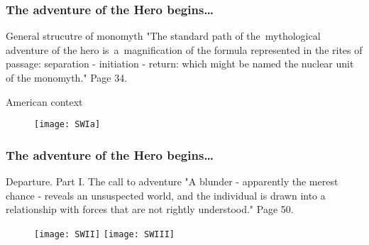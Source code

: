 \documentclass{beamer}  %
\begin{document}
\begin{frame}
  \frametitle{The adventure of the Hero begins\ldots}

  \begin{block}{General strucutre of monomyth}
    "The standard path of the~mythological adventure of the hero
    is~a~magnification of the formula represented in the rites of
    passage: separation - initiation - return: which might be named
    the nuclear unit of the monomyth." Page 34.
  \end{block}

  \begin{block}{American context}
    \begin{figure}
      \centering

      \texttt{[image: SWIa]}
    \end{figure}
  \end{block}

\end{frame}



\begin{frame}
  \frametitle{The adventure of the Hero begins\ldots}

  \begin{block}{Departure. Part I. The call to adventure}
    "A blunder - apparently the merest chance - reveals an unsuspected
    world, and the individual is drawn into a relationship with forces
    that are not rightly understood." Page 50.
  \end{block}

  \begin{block}{}
    \begin{figure}
      \centering

      \texttt{[image: SWII]}
      \texttt{[image: SWIII]}
    \end{figure}
  \end{block}

\end{frame}
\end{document}
